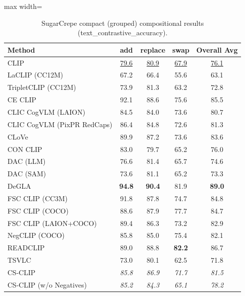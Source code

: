 \begin{table}[t]
  \centering
  \scriptsize
  \caption{SugarCrepe compact (grouped) compositional results (text_contrastive_accuracy).}
  \label{tab:SugarCrepe_compact}
  \begin{adjustbox}{max width=\textwidth}
  \setlength{\tabcolsep}{2pt}
  \begin{tabular}{p{5cm}ccc|c}
    \toprule
    Method & add & replace & swap & Overall Avg \\
    \midrule
    CLIP & \underline{79.6} & \underline{80.9} & \underline{67.9} & \underline{76.1} \\
    \midrule
    LaCLIP (CC12M) & 67.2 & 66.4 & 55.6 & 63.1 \\
    TripletCLIP (CC12M) & 73.9 & 81.3 & 63.2 & 72.8 \\
    \midrule
    CE CLIP & 92.1 & 88.6 & 75.6 & 85.5 \\
    CLIC CogVLM (LAION) & 84.5 & 84.0 & 73.6 & 80.7 \\
    CLIC CogVLM (PixPR RedCaps) & 86.4 & 84.8 & 72.6 & 81.3 \\
    CLoVe & 89.9 & 87.2 & 73.6 & 83.6 \\
    CON CLIP & 83.0 & 79.7 & 65.2 & 76.0 \\
    DAC (LLM) & 76.6 & 81.4 & 65.7 & 74.6 \\
    DAC (SAM) & 73.6 & 81.1 & 65.2 & 73.3 \\
    DeGLA & \textbf{94.8} & \textbf{90.4} & 81.9 & \textbf{89.0} \\
    FSC CLIP (CC3M) & 91.8 & 87.8 & 74.7 & 84.8 \\
    FSC CLIP (COCO) & 88.6 & 87.9 & 77.7 & 84.7 \\
    FSC CLIP (LAION+COCO) & 89.4 & 86.3 & 73.2 & 82.9 \\
    NegCLIP (COCO) & 85.8 & 85.0 & 75.4 & 82.1 \\
    READCLIP & 89.0 & 88.8 & \textbf{82.2} & 86.7 \\
    TSVLC & 73.0 & 80.1 & 62.5 & 71.8 \\
    \midrule
    CS-CLIP & \emph{85.8} & \emph{86.9} & \emph{71.7} & \emph{81.5} \\
    CS-CLIP (w/o Negatives) & \emph{85.2} & \emph{84.3} & \emph{65.1} & \emph{78.2} \\
    \bottomrule
  \end{tabular}
  \end{adjustbox}
\end{table}